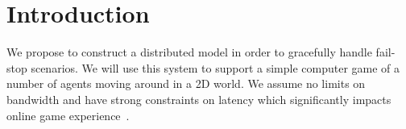 
\section{Introduction}
\label{sec:Intro}


We propose to construct a distributed \clientServer model in order to gracefully handle fail-stop scenarios. We will use this system to support a simple computer game of a number of agents moving around in a 2D world. We assume no limits on bandwidth and have strong constraints on latency which significantly impacts online game experience~\cite{Claypool:2006:LPA:1167838.1167860}.

	

